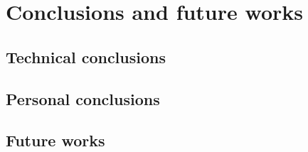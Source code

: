 \documentclass[twoside, openright, 11pt]{report}
\begin{document}
\chapter{Conclusions and future works}\label{cap.conclusions and future works}
  \section{Technical conclusions}
  \section{Personal conclusions}
  \section{Future works}

\cleardoublepage
{}
\end{document}
